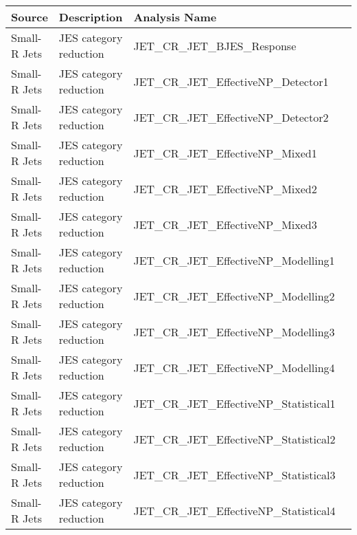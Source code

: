   \begin{table}[!hp]
  \centering
  \footnotesize
  \begin{center}
    \begin{tabular}{|l|l|l|l|}
      \hline
      Source        & Description                     & Analysis Name                                       \\ \hline
      Small-R Jets  & JES category reduction            &  JET\_CR\_JET\_BJES\_Response                            \\
      Small-R Jets  & JES category reduction            &  JET\_CR\_JET\_EffectiveNP\_Detector1                    \\
      Small-R Jets  & JES category reduction            &  JET\_CR\_JET\_EffectiveNP\_Detector2                    \\
      Small-R Jets  & JES category reduction            &  JET\_CR\_JET\_EffectiveNP\_Mixed1                       \\
      Small-R Jets  & JES category reduction            &  JET\_CR\_JET\_EffectiveNP\_Mixed2                       \\
      Small-R Jets  & JES category reduction            &  JET\_CR\_JET\_EffectiveNP\_Mixed3                       \\
      Small-R Jets  & JES category reduction            &  JET\_CR\_JET\_EffectiveNP\_Modelling1                   \\
      Small-R Jets  & JES category reduction            &  JET\_CR\_JET\_EffectiveNP\_Modelling2                   \\
      Small-R Jets  & JES category reduction            &  JET\_CR\_JET\_EffectiveNP\_Modelling3                   \\
      Small-R Jets  & JES category reduction            &  JET\_CR\_JET\_EffectiveNP\_Modelling4                   \\
      Small-R Jets  & JES category reduction            &  JET\_CR\_JET\_EffectiveNP\_Statistical1                 \\
      Small-R Jets  & JES category reduction            &  JET\_CR\_JET\_EffectiveNP\_Statistical2                 \\
      Small-R Jets  & JES category reduction            &  JET\_CR\_JET\_EffectiveNP\_Statistical3                 \\
      Small-R Jets  & JES category reduction            &  JET\_CR\_JET\_EffectiveNP\_Statistical4                 \\

\end{tabular}
\end{center}
\end{table}
